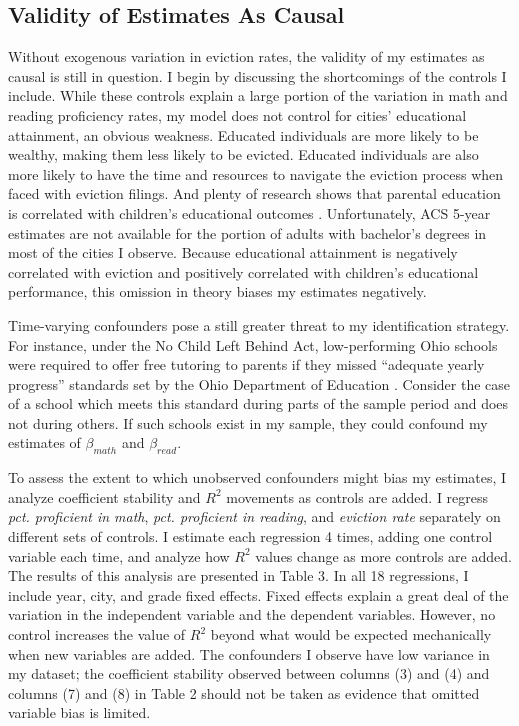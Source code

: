 \documentclass[12pt]{article}
\begin{document}
\subsection{Validity of Estimates As Causal}
Without exogenous variation in eviction rates, the validity of my estimates as causal is still in question. I begin by discussing the shortcomings of the controls I include. While these controls explain a large portion of the variation in math and reading proficiency rates, my model does not control for cities' educational attainment, an obvious weakness. Educated individuals are more likely to be wealthy, making them less likely to be evicted. Educated individuals are also more likely to have the time and resources to navigate the eviction process when faced with eviction filings. And plenty of research shows that parental education is correlated with children's educational outcomes \citep{tighe_influence_2021}. Unfortunately, ACS 5-year estimates are not available for the portion of adults with bachelor's degrees in most of the cities I observe. Because educational attainment is negatively correlated with eviction and positively correlated with children's educational performance, this omission in theory biases my estimates negatively. 


Time-varying confounders pose a still greater threat to my identification strategy. For instance, under the No Child Left Behind Act, low-performing Ohio schools were required to offer free tutoring to parents if they missed ``adequate yearly progress'' standards set by the Ohio Department of Education \citep{klein_no_2015}. Consider the case of a school which meets this standard during parts of the sample period and does not during others. If such schools exist in my sample, they could confound my estimates of $\beta_{math}$ and $\beta_{read}$.


To assess the extent to which unobserved confounders might bias my estimates, I analyze coefficient stability and $R^2$ movements as controls are added. I regress \emph{pct. proficient in math}, \emph{pct. proficient in reading}, and \emph{eviction rate} separately on different sets of controls. I estimate each regression 4 times, adding one control variable each time, and analyze how $R^2$ values change as more controls are added. The results of this analysis are presented in Table 3. In all 18 regressions, I include year, city, and grade fixed effects. Fixed effects explain a great deal of the variation in the independent variable and the dependent variables. However, no control increases the value of $R^2$ beyond what would be expected mechanically when new variables are added. The confounders I observe have low variance in my dataset; the coefficient stability observed between columns (3) and (4) and columns (7) and (8) in Table 2 should not be taken as evidence that omitted variable bias is limited.
\end{document}
